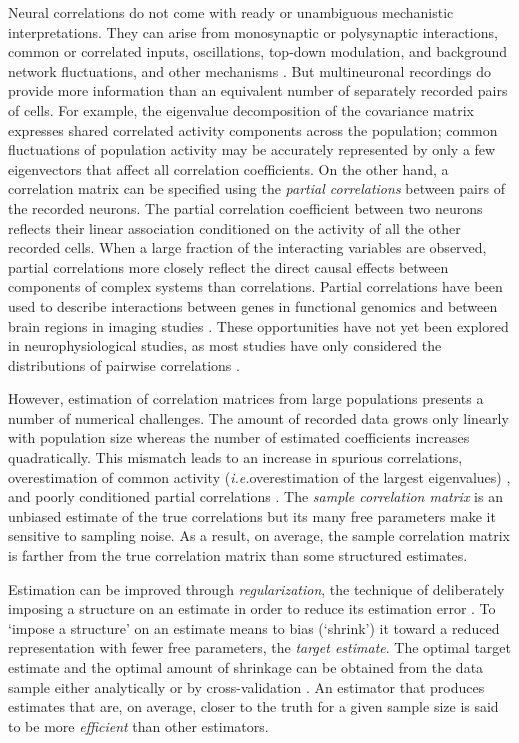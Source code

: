 \documentclass[10pt]{article}
\newcommand{\sq}[1]{\lq#1\rq}
\newcommand{\ie}{\emph{i.e.}\;}
\begin{document}
Neural correlations do not come with ready or unambiguous mechanistic interpretations. They can arise from monosynaptic or polysynaptic interactions, common or correlated inputs, oscillations, top-down modulation, and background network fluctuations, and other mechanisms \cite{Perkel:1967, Moore:1970, Shadlen:1998, Salinas:2001, Ostojic:2009, Rosenbaum:2011}. But multineuronal recordings do provide more information than an equivalent number of separately recorded pairs of cells. For example, the eigenvalue decomposition of the covariance matrix expresses shared correlated activity components across the population; common fluctuations of population activity may be accurately represented by only a few eigenvectors that affect all correlation coefficients. On the other hand, a correlation matrix can be specified using the \emph{partial correlations} between pairs of the recorded neurons. The partial correlation coefficient between two neurons reflects their linear association conditioned on the activity of all the other recorded cells.  When a large fraction of the interacting variables are observed, partial correlations more closely reflect the direct causal effects between components of complex systems than correlations. Partial correlations have been used to describe interactions between genes in functional genomics \cite{Schafer:2005, Peng:2009} and between brain regions in imaging studies \cite{Varoquaux:2012, Ryali:2012}. These opportunities have not yet been explored in neurophysiological studies, as most studies have only considered the distributions of pairwise correlations \cite{Zohary:1994, Bair:2001, Smith:2008, Ecker:2010}. 

However, estimation of correlation matrices from large populations presents a number of numerical challenges. The amount of recorded data grows only linearly with population size whereas the number of estimated coefficients increases quadratically. This mismatch leads to an increase in spurious correlations, overestimation of common activity (\ie overestimation of the largest eigenvalues) \cite{Ledoit:2004}, and poorly conditioned partial correlations \cite{Schafer:2005}. The \emph{sample correlation matrix} is an unbiased estimate of the true correlations but its many free parameters make it sensitive to sampling noise. As a result, on average, the sample correlation matrix is farther from the true correlation matrix than some structured estimates. 

Estimation can be improved through \emph{regularization},  the technique of deliberately imposing a structure on an estimate in order to reduce its estimation error \cite{Schafer:2005, Bickel:2006}. To \sq{impose a structure} on an estimate means to bias (\sq{shrink}) it toward a reduced representation  with fewer free parameters, the \emph{target estimate}.   The optimal target estimate and the optimal amount of shrinkage can be obtained from the data sample either analytically \cite{Ledoit:2003, Ledoit:2004, Schafer:2005}  or by cross-validation \cite{Friedman:1989}. An estimator that produces estimates that are, on average, closer to the truth for a given sample size is said to be more \emph{efficient} than other estimators.
\end{document}
